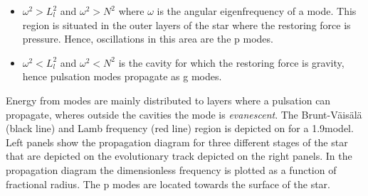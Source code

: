 \begin{itemize}
    \item $\omega^2 > L_l^2$ and $\omega^2 > N^2$ where $\omega$ is the angular eigenfrequency of a mode. This region is situated in the outer layers of the star where the restoring force is pressure. Hence, oscillations in this area are the p modes. 
    \item $\omega^2 < L^2_l$ and $\omega^2 < N^2$ is the cavity for which the restoring force is gravity, hence pulsation modes propagate as g modes. 
\end{itemize}

Energy from modes are mainly distributed to layers where a pulsation can propagate, wheres outside the cavities the mode is \textit{evanescent}. The Brunt-Väisälä (black line) and Lamb frequency (red line) region is depicted on  for a 1.9\msun model. Left panels show the propagation diagram for three different stages of the star that are depicted on the evolutionary track depicted on the right panels. In the propagation diagram the dimensionless frequency is plotted as a function of fractional radius. The p modes are located towards the surface of the star.
